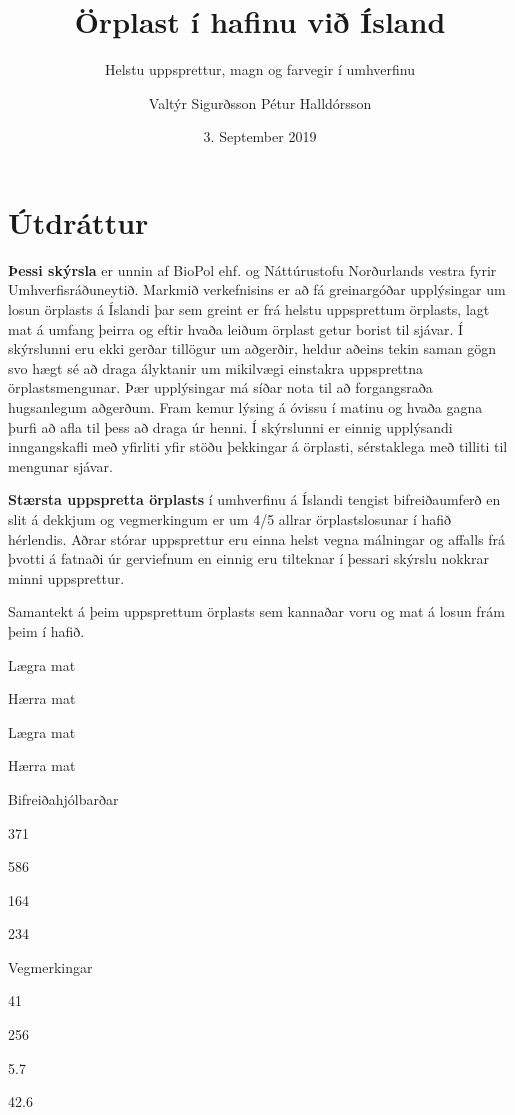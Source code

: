 \documentclass[icelandic,]{book}
\title{{Örplast í hafinu við Ísland}}
\subtitle{{ Helstu uppsprettur, magn og farvegir í umhverfinu}}
\author{{Valtýr Sigurðsson}
{Pétur Halldórsson}}
\date{3. September 2019}
\begin{document}
\maketitle

{
\setcounter{tocdepth}{1}
\tableofcontents
}
\listoftables
\listoffigures
\hypertarget{utdrattur}{%
\chapter*{Útdráttur}\label{utdrattur}}

\textbf{Þessi skýrsla} er unnin af BioPol ehf. og Náttúrustofu Norðurlands vestra fyrir Umhverfisráðuneytið. Markmið verkefnisins er að fá greinargóðar upplýsingar um losun örplasts á Íslandi þar sem greint er frá helstu uppsprettum örplasts, lagt mat á umfang þeirra og eftir hvaða leiðum örplast getur borist til sjávar. Í skýrslunni eru ekki gerðar tillögur um aðgerðir, heldur aðeins tekin saman gögn svo hægt sé að draga ályktanir um mikilvægi einstakra uppsprettna örplastsmengunar. Þær upplýsingar má síðar nota til að forgangsraða hugsanlegum aðgerðum. Fram kemur lýsing á óvissu í matinu og hvaða gagna þurfi að afla til þess að draga úr henni. Í skýrslunni er einnig upplýsandi inngangskafli með yfirliti yfir stöðu þekkingar á örplasti, sérstaklega með tilliti til mengunar sjávar.

\textbf{Stærsta uppspretta örplasts} í umhverfinu á Íslandi tengist bifreiðaumferð en slit á dekkjum og vegmerkingum er um 4/5 allrar örplastslosunar í hafið hérlendis. Aðrar stórar uppsprettur eru einna helst vegna málningar og affalls frá þvotti á fatnaði úr gerviefnum en einnig eru tilteknar í þessari skýrslu nokkrar minni uppsprettur.

\label{tab:smantekta}Samantekt á þeim uppsprettum örplasts sem kannaðar voru og mat á losun frám þeim í hafið.

Lægra mat

Hærra mat

Lægra mat

Hærra mat

Bifreiðahjólbarðar

371

586

164

234

Vegmerkingar

41

256

5.7

42.6
\end{document}
